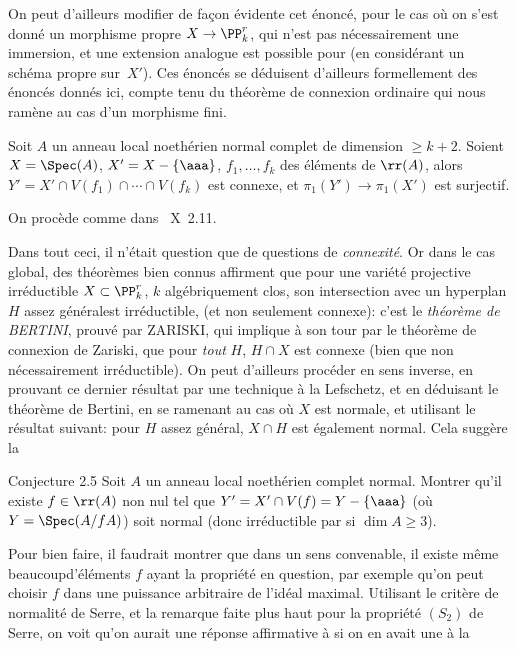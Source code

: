 On peut d'ailleurs modifier de fa\c con
\'evidente cet \'enonc\'e, pour le cas o\`u on s'est donn\'e un morphisme
propre $X \to \PP^r_k$, qui n'est pas n\'ecessairement une
immersion, et une extension analogue est possible pour
 (en consid\'erant un sch\'ema propre sur~$X'$). Ces
\'enonc\'es se d\'eduisent d'ailleurs formellement des \'enonc\'es donn\'es
ici, compte tenu du th\'eor\`eme de connexion ordinaire qui nous
ram\`ene au cas d'un morphisme fini.

\begin{corollaire} \label{XIII.2.4}
Soit $A$ un anneau local noeth\'erien normal complet de dimension $\ge k+2$. Soient $X=\Spec (A)$, $X'=X-\{ \aaa\}$, $f_1, \dotsc, f_k$ des \'el\'ements de $\rr(A)$, alors $Y'=X'\cap V(f_1) \cap \dotsb \cap V(f_k)$ est connexe, et $\pi_1(Y')\to \pi_1(X')$ est surjectif.
\end{corollaire}

On proc\`ede comme dans ~X~2.11.

Dans tout ceci, il n'\'etait question que de questions de \emph{connexit\'e}. Or dans le cas global, des th\'eor\`emes bien connus affirment que pour une vari\'et\'e projective irr\'eductible $X\subset \PP^r_k$, $k$ alg\'ebriquement clos, son intersection avec un hyperplan $H$ assez \og g\'en\'eral\fg est irr\'eductible, (et non seulement connexe): c'est le \emph{th\'eor\`eme de BERTINI}, prouv\'e par ZARISKI, qui implique \`a son tour par le th\'eor\`eme de connexion de Zariski, que pour \emph{tout} $H$, $H\cap X$ est connexe (bien que non n\'ecessairement irr\'eductible). On peut d'ailleurs proc\'eder en sens inverse, en prouvant ce dernier r\'esultat par une technique \`a la Lefschetz, et en d\'eduisant le th\'eor\`eme de Bertini, en se ramenant au cas o\`u $X$ est normale, et utilisant le r\'esultat suivant: pour $H$ \og assez g\'en\'eral\fg, $X\cap H$ est \'egalement normal. Cela sugg\`ere la

\label{XIII.2.5}
\begin{enonce*}{Conjecture 2.5\ndemark}
Soit $A$ un anneau local noeth\'erien complet normal. Montrer qu'il existe $f\in\rr(A)$ non nul tel que $Y'=X'\cap V(f)=Y-\{ \aaa\}$ (o\`u\pageoriginale $Y=\Spec (A/fA)$) soit normal (donc irr\'eductible par  si $\dim A\ge 3$).
\end{enonce*}

Pour bien faire, il faudrait montrer que dans un sens convenable, il existe m\^eme \og beaucoup\fg d'\'el\'ements $f$ ayant la propri\'et\'e en question, par exemple qu'on peut choisir $f$ dans une puissance arbitraire de l'id\'eal maximal. Utilisant le crit\`ere de normalit\'e de Serre, et la remarque faite plus haut pour la propri\'et\'e $(S_2)$ de Serre, on voit qu'on aurait une r\'eponse affirmative \`a  si on en avait une \`a la

